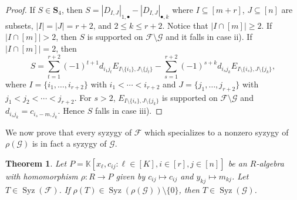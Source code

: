 \documentclass[utf8,latin1]{article}
\newtheorem{theorem}{Theorem}
\DeclareMathOperator{\Syz}{Syz}
\newcommand{\KK}{\mathbb{K}}
\newcommand{\abs}[1]{\ensuremath{\left\lvert #1 \right\rvert}}
\begin{document}
\begin{proof}
If $S\in \mathbf{S}_4$, then $S=\abs{D_{I,J}}_{1,\bullet} - \abs{D_{I,J}}_{\bullet,k}$ where $I\subseteq[m+r]$, $J\subseteq[n]$ are subsets, $\abs{I}= \abs{J} =r+2 $, and $2\leq k\leq r+2$.
Notice that $\abs{I\cap [m]}\ge 2$.
If $\abs{I\cap [m]}>2$, then $S$ is supported on $\mathcal{F}\setminus \mathcal{G}$ and it falls in case ii).
If $\abs{I\cap [m]}=2$, then
\[S = \sum_{t=1}^{r+2} (-1)^{t+1} d_{i_1 j_t}E_{I\setminus \{i_1\},J\setminus \{j_t\}} - \sum_{s=1}^{r+2} (-1)^{s+k} d_{i_s j_k}E_{I\setminus \{i_s\},J\setminus \{j_k\}},\]
where $I=\{i_1,\ldots,i_{r+2}\}$ with $i_1<\cdots<i_{r+2}$ and $J=\{j_1,\ldots,j_{r+2}\}$ with $j_1<j_2<\cdots<j_{r+2}$. 
For $s>2$, $E_{I\setminus \{i_s\},J\setminus \{j_k\}}$ is supported on $\mathcal{F}\setminus\mathcal{G}$ and $d_{i_s j_k} = c_{i_s-m, j_k}$. 
Hence $S$ falls in case iii).
\end{proof}

We now prove that every syzygy of $\mathcal{F}$ which specializes to a nonzero syzygy of $\rho(\mathcal{G})$ is in fact a syzygy of $\mathcal{G}$.

\begin{theorem}\label{thm:supp}
Let $P=\KK[x_\ell,c_{ij}: \ell\in[K], i\in[r], j\in[n]]$ be an $R$-algebra with homomorphism $\rho:R\rightarrow P$ given by $c_{ij}\mapsto c_{ij}$ and $y_{kj}\mapsto m_{kj}$.
Let $T\in \Syz(\mathcal{F})$. If $\rho(T)\in \Syz(\rho(\mathcal{G}))\setminus\{0\}$, then $T\in\Syz(\mathcal{G})$.
\end{theorem}
\end{document}
